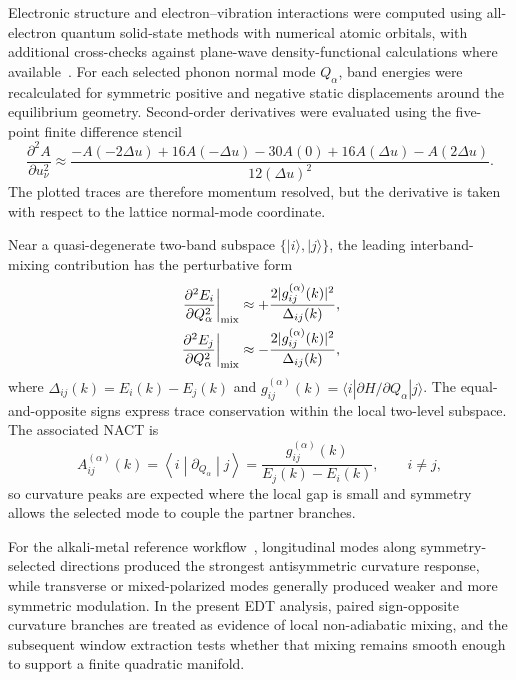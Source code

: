 \documentclass[12pt]{article}
\begin{document}
Electronic structure and electron--vibration interactions were computed using
all-electron quantum solid-state methods with numerical atomic orbitals, with
additional cross-checks against plane-wave density-functional calculations
where available~\cite{Blum2009,FHIaims2020,Giannozzi2009,Giannozzi2017}.
For each selected phonon normal mode $Q_\alpha$, band energies were recalculated
for symmetric positive and negative static displacements around the equilibrium
geometry. Second-order derivatives were evaluated using the five-point finite
difference stencil
\begin{equation}
\frac{\partial^2 A}{\partial u_\nu^2}
\approx
\frac{-A(-2\Delta u)+16A(-\Delta u)-30A(0)+16A(\Delta u)-A(2\Delta u)}
{12(\Delta u)^2}.
\end{equation}
The plotted traces are therefore momentum resolved, but the derivative is taken
with respect to the lattice normal-mode coordinate.

Near a quasi-degenerate two-band subspace $\{|i\rangle,|j\rangle\}$, the leading
interband-mixing contribution has the perturbative form
\begin{align}
\left.\frac{\partial^2 E_i}{\partial Q_\alpha^2}\right|_{\rm mix}
&\approx
+\frac{2|g_{ij}^{(\alpha)}(k)|^2}{\Delta_{ij}(k)},\\
\left.\frac{\partial^2 E_j}{\partial Q_\alpha^2}\right|_{\rm mix}
&\approx
-\frac{2|g_{ij}^{(\alpha)}(k)|^2}{\Delta_{ij}(k)},
\end{align}
where $\Delta_{ij}(k)=E_i(k)-E_j(k)$ and
$g_{ij}^{(\alpha)}(k)=\langle i|\partial H/\partial Q_\alpha|j\rangle$.
The equal-and-opposite signs express trace conservation within the local
two-level subspace. The associated NACT is
\begin{equation}
A_{ij}^{(\alpha)}(k)
=
\left\langle i\middle|\partial_{Q_\alpha}\middle|j\right\rangle
=
\frac{g_{ij}^{(\alpha)}(k)}{E_j(k)-E_i(k)},\qquad i\neq j,
\end{equation}
so curvature peaks are expected where the local gap is small and symmetry allows
the selected mode to couple the partner branches.

For the alkali-metal reference workflow~\cite{Hu2026_JPCM}, longitudinal modes
along symmetry-selected directions produced the strongest antisymmetric curvature
response, while transverse or mixed-polarized modes generally produced weaker
and more symmetric modulation. In the present EDT analysis, paired sign-opposite
curvature branches are treated as evidence of local non-adiabatic mixing, and
the subsequent window extraction tests whether that mixing remains smooth enough
to support a finite quadratic manifold.
\end{document}
